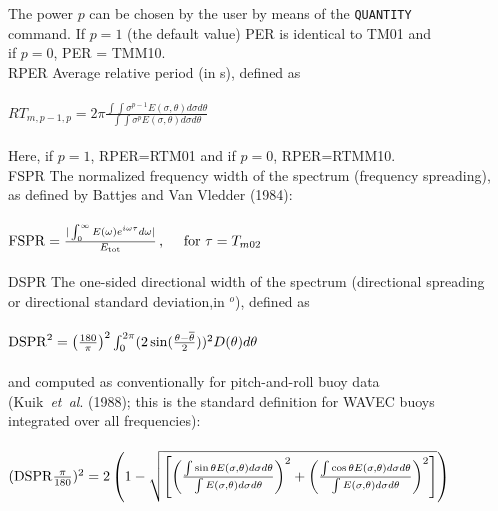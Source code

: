 \documentclass[12pt]{book}
\begin{document}
\begin{tabbing}
                        The power $p$ can be chosen by the user by means of the {\tt QUANTITY}\\
                        command. If $p=1$ (the default value) PER is identical to TM01 and\\
                        if $p=0$, PER = TMM10.\-\\
RPER                 \> Average relative period (in s), defined as\+\\
                        \\
$RT_{m,p-1,p} = 2\pi \frac{\int \int \sigma^{p-1} E(\sigma, \theta) d\sigma d\theta}{\int \int \sigma^p E(\sigma, \theta) d\sigma d\theta}$ \\
                        \\
                        Here, if $p=1$, RPER=RTM01 and if $p=0$, RPER=RTMM10.\-\\
FSPR                 \> The normalized frequency width of the spectrum (frequency spreading),\+\\
                        as defined by Battjes and Van Vledder (1984):\\
                        \\
${\rm FSPR} = \frac{|\int_{0}^{\infty} E(\omega) e^{i\omega \tau}d\omega|}{E_{\rm tot}} \, , \quad \, \, {\rm for} \, \, \tau = T_{m02}$ \\
                        \-\\
DSPR                 \> The one-sided directional width of the spectrum (directional spreading\+\\
                        or directional standard deviation,in $^o$), defined as\\
                        \\
${\rm DSPR}^2 = \left( \frac{180}{\pi} \right)^2 \int_{0}^{2\pi} (2 \sin (\frac{\theta-\overline{\theta}}{2}))^2 D(\theta) d\theta$ \\
                        \\
                        and computed as conventionally for pitch-and-roll buoy data\\
                        (Kuik~{\it et~al}. (1988); this is the standard definition for WAVEC buoys\\
                        integrated over all frequencies):\\
                        \\
$({\rm DSPR} \frac{\pi}{180})^2 = 2\left( 1 - \sqrt{\left[ \left( \frac{\int\sin\theta E(\sigma,\theta)d\sigma d\theta}{\int E(\sigma,\theta)d\sigma d\theta} \right)^2 + \left( \frac{\int \cos\theta E(\sigma,\theta)d\sigma d\theta}{\int E(\sigma,\theta)d\sigma d\theta} \right)^2 \right]}\right)$ \\

\end{tabbing}
\end{document}
